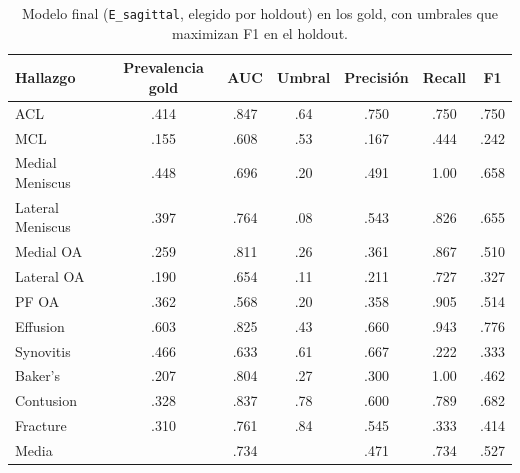 \begin{table}[t]
  \caption{Modelo final (\texttt{E\_sagittal}, elegido por holdout) en los gold, con umbrales que maximizan F1 en el holdout.}
  \label{tab:prf}
  \centering
  \small
  \begin{tabular}{@{}lcccccc@{}}
    \toprule
    Hallazgo & Prevalencia gold & AUC & Umbral & Precisión & Recall & F1 \\
    \midrule
    ACL              & .414 & .847 & .64 & .750 & .750 & .750 \\
    MCL              & .155 & .608 & .53 & .167 & .444 & .242 \\
    Medial Meniscus  & .448 & .696 & .20 & .491 & 1.00 & .658 \\
    Lateral Meniscus & .397 & .764 & .08 & .543 & .826 & .655 \\
    Medial OA        & .259 & .811 & .26 & .361 & .867 & .510 \\
    Lateral OA       & .190 & .654 & .11 & .211 & .727 & .327 \\
    PF OA            & .362 & .568 & .20 & .358 & .905 & .514 \\
    Effusion         & .603 & .825 & .43 & .660 & .943 & .776 \\
    Synovitis        & .466 & .633 & .61 & .667 & .222 & .333 \\
    Baker's          & .207 & .804 & .27 & .300 & 1.00 & .462 \\
    Contusion        & .328 & .837 & .78 & .600 & .789 & .682 \\
    Fracture         & .310 & .761 & .84 & .545 & .333 & .414 \\
    \midrule
    Media            &      & .734 &     & .471 & .734 & .527 \\
    \bottomrule
  \end{tabular}
\end{table}

